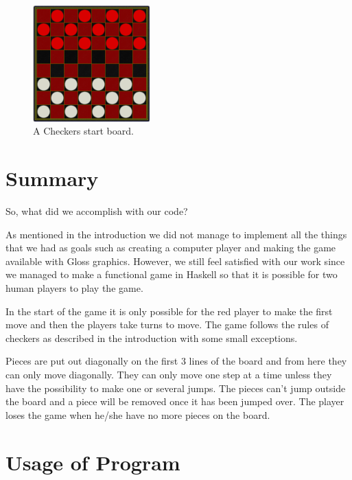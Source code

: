 \documentclass[12pt,a4paper]{article}
\begin{document}
\begin{figure}
	\begin{center}
		\includegraphics[width= 0.4\textwidth]{hej.jpg}
	\end{center}
	\caption{A Checkers start board.}
	\label{fig:Checkers}
\end{figure}
\section{Summary}
So, what did we accomplish with our code? 

As mentioned in the introduction we did not manage to implement all the things that we had as goals such as creating a computer player and making the game available with Gloss graphics. However, we still feel satisfied with our work since we managed to make a functional game in Haskell so that it is possible for two human players to play the game.

In the start of the game it is only possible for the red player to make the first move and then the players take turns to move. The game follows the rules of checkers as described in the introduction with some small exceptions.

Pieces are put out diagonally on the first 3 lines of the board and from here they can only move diagonally. They can only move one step at a time unless they have the possibility to make one or several jumps. The pieces can’t jump outside the board and a piece will be removed once it has been jumped over. The player loses the game when he/she have no more pieces on the board. 

\section{Usage of Program}
\end{document}
